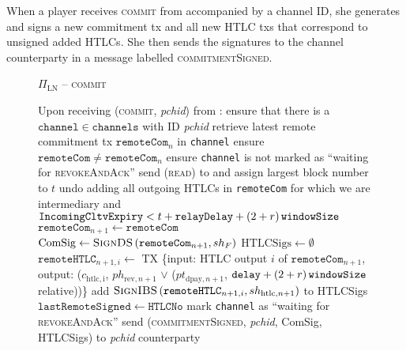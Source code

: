   When a player receives \textsc{commit} from \environment{} accompanied by a
  channel ID, she generates and signs a new commitment tx and all new HTLC
  txs that correspond to unsigned added HTLCs. She then sends the signatures to
  the channel counterparty in a message labelled \textsc{commitmentSigned}.

  \begin{figure}[H]
    \begin{protocolbox}{$\Pi_{\mathrm{LN}}$ -- \textsc{commit}}
      \begin{algorithmic}[1]
        \State Upon receiving (\textsc{commit}, \textit{pchid}) from
        \environment:
        \Indent
          \State ensure that there is a $\mathtt{channel} \in \mathtt{channels}$
          with ID \textit{pchid}
          \State retrieve latest remote commitment tx $\mathtt{remoteCom}_n$ in
          \texttt{channel}
          \State ensure $\mathtt{remoteCom} \neq \mathtt{remoteCom}_n$
          \State ensure \texttt{channel} is not marked as ``waiting for
          \textsc{revokeAndAck}''
          \label{alg:protocol:pay:commit:nomark}
          \State send (\textsc{read}) to \ledger{} and assign largest block
          number to $t$
          \State undo adding all outgoing HTLCs in \texttt{remoteCom} for which
          we are intermediary and $\mathtt{IncomingCltvExpiry} < t +
          \mathtt{relayDelay} + \left(2 + r\right)\texttt{windowSize}$
          \State $\mathtt{remoteCom}_{n+1} \gets \mathtt{remoteCom}$
          \State $\mathrm{ComSig} \gets
          \textsc{SignDS}\left(\mathtt{remoteCom}_{n+1}, sh_F\right)$
          \State $\mathrm{HTLCSigs} \gets \emptyset$
            \State $\mathtt{remoteHTLC}_{n+1, i} \gets$ TX \{input: HTLC output
            $i$ of $\mathtt{remoteCom}_{n+1}$, output: ($c_{\mathrm{htlc, i}}$,
            $ph_{\mathrm{rev}, n+1}$ $\vee$ ($pt_{\mathrm{dpay}, n+1}$,
            $\mathtt{delay} + \left(2 + r\right)\texttt{windowSize}{}$ relative))\}
            \State add $\textsc{SignIBS}\left(\mathtt{remoteHTLC}_{n+1, i},
            sh_{\mathrm{htlc}, n+1}\right)$ to HTLCSigs
          \EndFor
          \State $\mathtt{lastRemoteSigned} \gets \mathtt{HTLCNo}$
          \State mark \texttt{channel} as ``waiting for \textsc{revokeAndAck}''
          \label{alg:protocol:pay:commit:mark}
          \State send (\textsc{commitmentSigned}, \textit{pchid}, ComSig,
          HTLCSigs) to \textit{pchid} counterparty
        \EndIndent
      \end{algorithmic}
    \end{protocolbox}
    \caption{}
    \label{alg:protocol:pay:commit}
  \end{figure}


